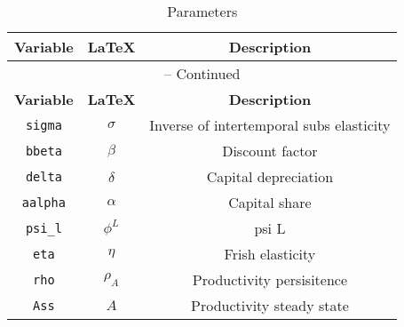 \begin{center}
\begin{longtable}{ccc}
\caption{Parameters}\\%
\hline%
\multicolumn{1}{c}{\textbf{Variable}} &
\multicolumn{1}{c}{\textbf{\LaTeX}} &
\multicolumn{1}{c}{\textbf{Description}}\\%
\hline\hline%
\endfirsthead
\multicolumn{3}{c}{{\tablename} \thetable{} -- Continued}\\%
\hline%
\multicolumn{1}{c}{\textbf{Variable}} &
\multicolumn{1}{c}{\textbf{\LaTeX}} &
\multicolumn{1}{c}{\textbf{Description}}\\%
\hline\hline%
\endhead
\texttt{sigma} & $\sigma$ & Inverse of intertemporal subs elasticity\\
\texttt{bbeta} & $\beta$ & Discount factor\\
\texttt{delta} & $\delta$ & Capital depreciation\\
\texttt{aalpha} & $\alpha$ & Capital share\\
\texttt{psi\_l} & $\phi^{L}$ & psi L\\
\texttt{eta} & $\eta$ & Frish elasticity\\
\texttt{rho} & $\rho_{A}$ & Productivity persisitence\\
\texttt{Ass} & $A$ & Productivity steady state\\
\hline%
\end{longtable}
\end{center}
